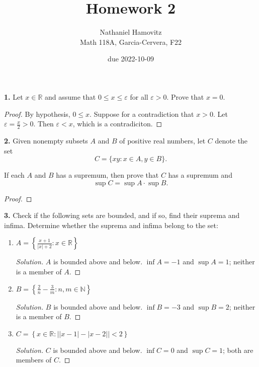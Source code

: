 \documentclass{article}
\newcommand{\R}{\mathbb{R}}
\newcommand{\N}{\mathbb{N}}
\newcommand{\abs}[1]{\left| #1 \right|}
\newcommand{\set}[1]{\left\{ #1 \right\}}
\newenvironment{solution}{\begin{proof}[Solution]}{\end{proof}}
\begin{document}


\title{Homework 2} %
\author{Nathaniel Hamovitz\\Math 118A, Garcia-Cervera, F22}
\date{due 2022-10-09}

\maketitle

\textbf{1. } %
Let $x \in \R$ and assume that $0 \le x \le \varepsilon$ for all $\varepsilon > 0$. Prove that $x = 0$.

\begin{proof}
    By hypothesis, $0 \le x$. Suppose for a contradiction that $x > 0$. Let $\varepsilon = \frac{x}{2} > 0$. Then $\varepsilon < x$, which is a contradiciton.    
\end{proof}


\newpage %


\textbf{2. }
Given nonempty subsets $A$ and $B$ of positive real numbers, let $C$ denote the set
$$C = \{xy : x \in A, y \in B\}.$$

If each $A$ and $B$ has a supremum, then prove that $C$ has a supremum and
$$\sup C = \sup A \cdot \sup B.$$

\begin{proof}
    
\end{proof}


\newpage %


\textbf{3. }
Check if the following sets are bounded, and if so, find their suprema and infima. Determine whether the suprema and infima belong to the set:

\renewcommand{\labelenumi}{(\alph{enumi}).}
\begin{enumerate}
    \item
    $\displaystyle A = \set{\frac{x + 1}{\abs{x} + 2} : x \in \R}$
    \begin{solution}
        $A$ is bounded above and below. $\inf A = -1$ and $\sup A = 1$; neither is a member of $A$.
    \end{solution}


    \item 
    $\displaystyle B = \set{\frac{2}{n} - \frac{3}{m} : n, m \in \N}$
    \begin{solution}
        $B$ is bounded above and below. $\inf B = -3$ and $\sup B = 2$; neither is a member of $B$.

    \end{solution}


    \item 
    $\displaystyle C = \set{x \in \R : \abs{\abs{x - 1} - \abs{x - 2}} < 2}$
    \begin{solution}
        $C$ is bounded above and below. $\inf C = 0$ and $\sup C = 1$; both are members of $C$.

    \end{solution}
\end{enumerate}
\end{document}
